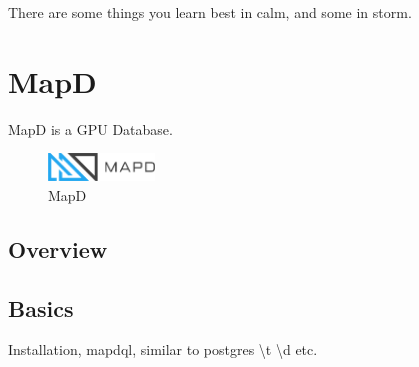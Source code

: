 \begin{savequote}[75mm]
There are some things you learn best in calm, and some in storm.
\end{savequote}

\chapter{MapD}

MapD is a GPU Database.

\begin{figure}[H]
\centering
\captionsetup{justification=centering}
\includegraphics[width=80pt]{images/mapd_logo.png}
\caption[MapD]{MapD}
\end{figure}

\newpage

\section{Overview}

\section{Basics}
Installation,
mapdql,
similar to postgres \textbackslash t \textbackslash d
etc.